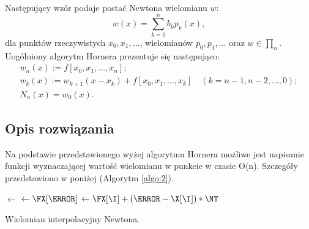 \documentclass{classrep}
\begin{document}
		Następujący wzór podaje postać Newtona wielomianu $w$:
		$$w(x)=\sum_{k=0}^n b_kp_k(x),$$
		dla punktów rzeczywistych $x_0, x_1,\ldots$, wielomianów $p_0, p_1, \ldots$ oraz $w \in \prod_n$.
		Uogólniony algorytm Hornera prezentuje się następująco:
		$$\begin{aligned}
			&w_n(x) := f[x_0, x_1, \ldots, x_n];&\\
			&w_k(x) := w_{k+1}(x-x_k)+ f[x_0, x_1, \ldots, x_k]	\quad(k=n-1, n-2, \ldots, 0);&\\
			&N_n(x) = w_0(x).
		\end{aligned}$$
				
	\subsection{Opis rozwiązania}	
		Na podstawie przedstawionego wyżej algorytmu Hornera możliwe jest napisanie funkcji wyznaczającej wartość wielomianu w punkcie w czasie O(n).
		Szczegóły przedstawiono w poniżej (Algorytm \ref{algo:2}).
	
		\begin{algorithm}[!htbp]

		    	
    			\Fun{\F{\X, \FX, \T}} {
		    		\N $\gets$ \LEN{\FX}\;
		    		\NT $\gets \FX[\N]$\;
		    		 {
		    			\NT $\gets \FX[\I] + (\T - \X[\I]) * \NT$\; 		
		    		}
		    		\KwRet \NT\;
    			}
    			\caption{Wielomian interpolacyjny Newtona.}
    			\label{algo:2}
		\end{algorithm}	
\end{document}
